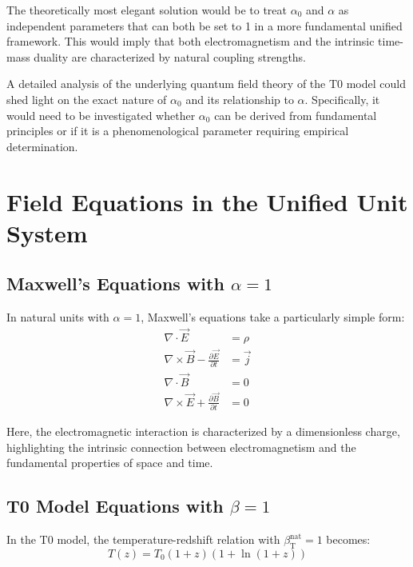 \documentclass[12pt,a4paper]{article}
\newcommand{\betaT}{\beta_{\text{T}}}
\begin{document}
	The theoretically most elegant solution would be to treat \(\alpha_0\) and \(\alpha\) as independent parameters that can both be set to 1 in a more fundamental unified framework. This would imply that both electromagnetism and the intrinsic time-mass duality are characterized by natural coupling strengths.
	
	A detailed analysis of the underlying quantum field theory of the T0 model could shed light on the exact nature of \(\alpha_0\) and its relationship to \(\alpha\). Specifically, it would need to be investigated whether \(\alpha_0\) can be derived from fundamental principles or if it is a phenomenological parameter requiring empirical determination.
	
	\section{Field Equations in the Unified Unit System}
	
	\subsection{Maxwell's Equations with \(\alpha = 1\)}
	
	In natural units with \(\alpha = 1\), Maxwell's equations take a particularly simple form:
	\begin{align}
		\nabla \cdot \vec{E} &= \rho \\
		\nabla \times \vec{B} - \frac{\partial \vec{E}}{\partial t} &= \vec{j} \\
		\nabla \cdot \vec{B} &= 0 \\
		\nabla \times \vec{E} + \frac{\partial \vec{B}}{\partial t} &= 0
	\end{align}
	
	Here, the electromagnetic interaction is characterized by a dimensionless charge, highlighting the intrinsic connection between electromagnetism and the fundamental properties of space and time.
	
	\subsection{T0 Model Equations with \(\beta = 1\)}
	
	In the T0 model, the temperature-redshift relation with \(\betaT^{\text{nat}} = 1\) becomes:
	\begin{equation}
		T(z) = T_0 (1+z)(1+\ln(1+z))
	\end{equation}
	
\end{document}
